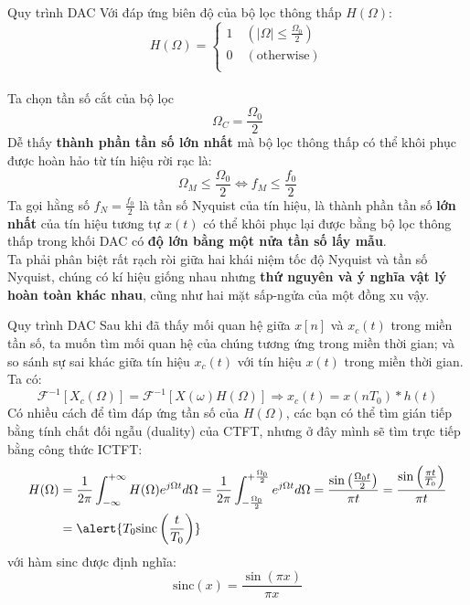 \documentclass[8pt]{beamer}
\begin{document}
\begin{frame}{Quy trình DAC}
Với đáp ứng biên độ của bộ lọc thông thấp $H(\Omega)$:
\begin{equation*}
H(\Omega)=
\begin{cases}
	1\quad(|\Omega|\leq\frac{\Omega_{0}}{2})\\
	0\quad(\text{otherwise})\\
\end{cases}
\end{equation*}
\\ Ta chọn tần số cắt của bộ lọc $$\Omega_{C}=\frac{\Omega_{0}}{2}$$
Dễ thấy \textbf{thành phần tần số lớn nhất} mà bộ lọc thông thấp có thể khôi phục được hoàn hảo từ tín hiệu rời rạc là: $$\Omega_{M}\leq\frac{\Omega_{0}}{2}\Leftrightarrow f_{M}\leq\frac{f_{0}}{2}$$
Ta gọi hằng số $f_{N}=\frac{f_{0}}{2}$ là \alert{tần số Nyquist của tín hiệu}, là thành phần tần số \textbf{lớn nhất} của tín hiệu tương tự $x(t)$ có thể khôi phục lại được bằng bộ lọc thông thấp trong khối DAC có \textbf{độ lớn bằng một nửa tần số lấy mẫu}.
\\  Ta phải phân biệt rất rạch ròi giữa hai khái niệm \alert{tốc độ Nyquist} và \alert{tần số Nyquist}, chúng có kí hiệu giống nhau nhưng \textbf{thứ nguyên và ý nghĩa vật lý hoàn toàn khác nhau}, cũng như hai mặt sấp-ngửa của một đồng xu vậy.

\end{frame}
\begin{frame}{Quy trình DAC}
Sau khi đã thấy mối quan hệ giữa $x[n]$ và $x_{c}(t)$ trong miền tần số, ta muốn tìm mối quan hệ của chúng tương ứng trong miền thời gian; và so sánh sự sai khác giữa tín hiệu $x_{c}(t)$ với tín hiệu $x(t)$ trong miền thời gian.
Ta có:
$$\mathscr{F}^{-1}[X_{c}(\Omega)]=\mathscr{F}^{-1}[X(\omega)H(\Omega)]\Rightarrow x_{c}(t)=x(nT_{0})*h(t)$$
Có nhiều cách để tìm đáp ứng tần số của $H(\Omega)$, các bạn có thể tìm gián tiếp bằng tính chất đối ngẫu (duality) của CTFT, nhưng ở đây mình sẽ tìm trực tiếp bằng công thức ICTFT:
\begin{equation*}
\begin{split}
	H(\Omega)&=\frac{1}{2\pi}\int_{-\infty}^{+\infty}H(\Omega)e^{j\Omega t}d\Omega=\frac{1}{2\pi}\int_{-\frac{\Omega_{0}}{2}}^{+\frac{\Omega_{0}}{2}}e^{j\Omega t}d\Omega=\frac{\sin\left(\frac{\Omega_{0}t}{2}\right)}{\pi t}=\frac{\sin\left(\frac{\pi t}{T_{0}}\right)}{\pi t}\\
		 &= \alert{T_{0}\text{sinc}\left(\frac{t}{T_{0}}\right)}
\end{split}
\end{equation*}
với hàm sinc được định nghĩa: $$\text{sinc}(x)=\frac{\sin(\pi x)}{\pi x}$$ 
\end{frame}
\end{document}
